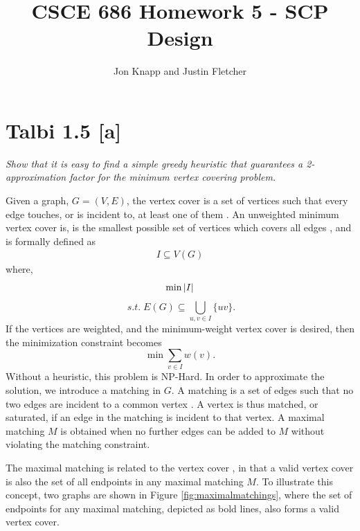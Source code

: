 \documentclass[12pt]{article}
\begin{document}
\title{CSCE 686 Homework 5 - SCP Design}
\author{Jon Knapp and Justin Fletcher}
\maketitle

\section{Talbi 1.5 [a]}
\textit{Show that it is easy to find a simple greedy heuristic that guarantees a 2-approximation factor for the minimum vertex covering problem.}
\linebreak

Given a graph, $G=(V, E)$, the vertex cover is a set of vertices such that every edge touches, or is incident to, at least one of them \cite{Lecture21}. An unweighted minimum vertex cover is, is the smallest possible set of vertices which covers all edges \cite{Dartmouth}, and is formally defined as
\begin{align*}
I\subseteq V(G) 
\end{align*} 
where,
\begin{equation*}
\min |I| \\
\end{equation*}
\begin{equation*}
\; s.t. \; E(G)\subseteq \bigcup_{u,v \in I}\{uv\}.
\end{equation*}
If the vertices are weighted, and the minimum-weight vertex cover is desired, then the minimization constraint becomes 
\begin{equation*}
\min \sum_{v\in I} w(v).
\end{equation*}
Without a heuristic, this problem is NP-Hard. In order to approximate the solution, we introduce a matching in $G$. A matching is a set of edges such that no two edges are incident to a common vertex \cite{Suhendry}. A vertex is thus matched, or saturated, if an edge in the matching is incident to that vertex. A maximal matching $M$ is obtained when no further edges can be added to $M$ without violating the matching constraint.

The maximal matching is related to the vertex cover \cite{Suhendry}, in that a valid vertex cover is also the set of all endpoints in any maximal matching $M$. To illustrate this concept, two graphs are shown in Figure  \ref{fig:maximalmatchings}, where the set of endpoints for any maximal matching, depicted as bold lines, also forms a valid vertex cover.
\end{document}
